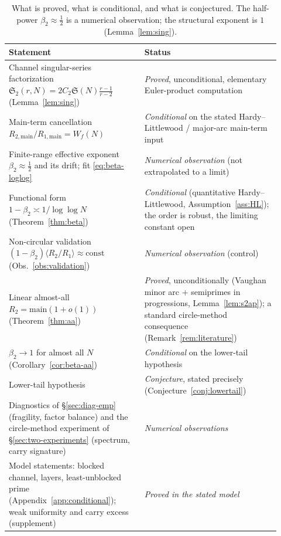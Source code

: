 \documentclass[]{interact}%
\newcommand{\sing}{\mathfrak S}
\begin{document}
\begin{table}[h]
\centering
\small
\begin{tabular}{p{0.46\linewidth}p{0.46\linewidth}}
\toprule
Statement & Status \\
\midrule
Channel singular-series factorization $\sing_2(r,N)=2C_2\sing(N)\tfrac{r-1}{r-2}$ (Lemma~\ref{lem:sing}) & \emph{Proved}, unconditional, elementary Euler-product computation \\
Main-term cancellation $R_{2,\mathrm{main}}/R_{1,\mathrm{main}}=W_f(N)$ & \emph{Conditional} on the stated Hardy--Littlewood / major-arc main-term input \\
Finite-range effective exponent $\beta_2\approx\tfrac12$ and its drift; fit \eqref{eq:beta-loglog} & \emph{Numerical observation} (not extrapolated to a limit) \\
Functional form $1-\beta_2\asymp1/\log\log N$ (Theorem~\ref{thm:beta}) & \emph{Conditional} (quantitative Hardy--Littlewood, Assumption~\ref{ass:HL}); the order is robust, the limiting constant open \\
Non-circular validation $(1-\beta_2)\langle R_2/R_1\rangle\approx\mathrm{const}$ (Obs.~\ref{obs:validation}) & \emph{Numerical observation} (control) \\
Linear almost-all $R_2=\mathrm{main}(1+o(1))$ (Theorem~\ref{thm:aa}) & \emph{Proved}, unconditionally (Vaughan minor arc + semiprimes in progressions, Lemma~\ref{lem:s2ap}); a standard circle-method consequence (Remark~\ref{rem:literature}) \\
$\beta_2\to1$ for almost all $N$ (Corollary~\ref{cor:beta-aa}) & \emph{Conditional} on the lower-tail hypothesis \\
Lower-tail hypothesis & \emph{Conjecture}, stated precisely (Conjecture~\ref{conj:lowertail}) \\
Diagnostics of \S\ref{sec:diag-emp} (fragility, factor balance) and the circle-method experiment of \S\ref{sec:two-experiments} (spectrum, carry signature) & \emph{Numerical observations} \\
Model statements: blocked channel, layers, least-unblocked prime (Appendix~\ref{app:conditional}); weak uniformity and carry excess (supplement) & \emph{Proved in the stated model} \\
\bottomrule
\end{tabular}
\caption{What is proved, what is conditional, and what is conjectured. The half-power
$\beta_2\approx\tfrac12$ is a numerical observation; the structural exponent is $1$
(Lemma~\ref{lem:sing}).}
\label{tab:status}
\end{table}
\end{document}
